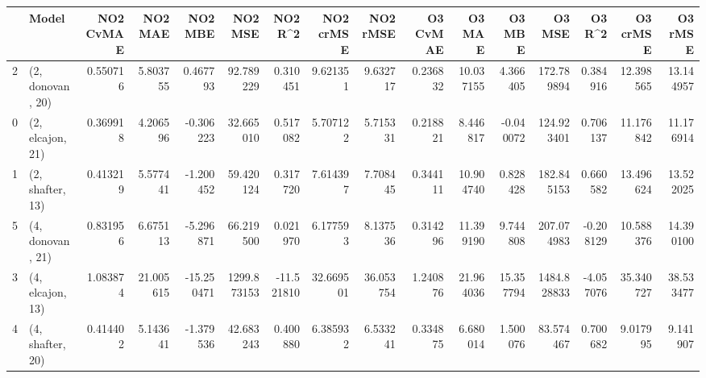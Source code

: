\begin{tabular}{llrrrrrrrrrrrrrr}
\toprule
{} &             Model &  NO2 CvMAE &    NO2 MAE &    NO2 MBE &      NO2 MSE &    NO2 R\textasciicircum2 &  NO2 crMSE &   NO2 rMSE &  O3 CvMAE &     O3 MAE &     O3 MBE &       O3 MSE &    O3 R\textasciicircum2 &   O3 crMSE &    O3 rMSE \\
\midrule
2 &  (2, donovan, 20) &   0.550716 &   5.803755 &   0.467793 &    92.789229 &   0.310451 &   9.621351 &   9.632717 &  0.236832 &  10.037155 &   4.366405 &   172.789894 &  0.384916 &  12.398565 &  13.144957 \\
0 &  (2, elcajon, 21) &   0.369918 &   4.206596 &  -0.306223 &    32.665010 &   0.517082 &   5.707122 &   5.715331 &  0.218821 &   8.446817 &  -0.040072 &   124.923401 &  0.706137 &  11.176842 &  11.176914 \\
1 &  (2, shafter, 13) &   0.413219 &   5.577441 &  -1.200452 &    59.420124 &   0.317720 &   7.614397 &   7.708445 &  0.344111 &  10.904740 &   0.828428 &   182.845153 &  0.660582 &  13.496624 &  13.522025 \\
5 &  (4, donovan, 21) &   0.831956 &   6.675113 &  -5.296871 &    66.219500 &   0.021970 &   6.177593 &   8.137536 &  0.314296 &  11.399190 &   9.744808 &   207.074983 & -0.208129 &  10.588376 &  14.390100 \\
3 &  (4, elcajon, 13) &   1.083874 &  21.005615 & -15.250471 &  1299.873153 & -11.521810 &  32.669501 &  36.053754 &  1.240876 &  21.964036 &  15.357794 &  1484.828833 & -4.057076 &  35.340727 &  38.533477 \\
4 &  (4, shafter, 20) &   0.414402 &   5.143641 &  -1.379536 &    42.683243 &   0.400880 &   6.385932 &   6.533241 &  0.334875 &   6.680014 &   1.500076 &    83.574467 &  0.700682 &   9.017995 &   9.141907 \\
\bottomrule
\end{tabular}
